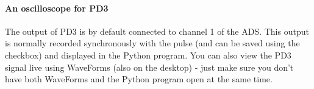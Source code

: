 \documentclass{../lab}
\begin{document}

\paragraph{An oscilloscope for PD3}

The output of PD3 is by default connected to channel 1 of the ADS. This output is normally recorded synchronously with the pulse (and can be saved using the checkbox) and displayed in the Python program. You can also view the PD3 signal live using WaveForms (also on the desktop) - just make sure you don't have both WaveForms and the Python program open at the same time.




\end{document}
